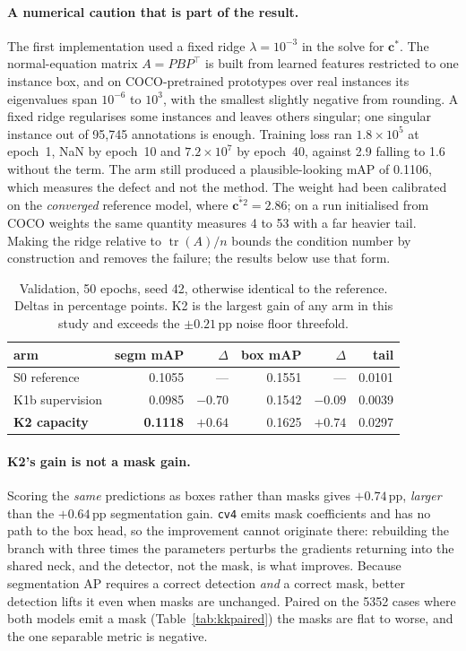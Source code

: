 \documentclass[11pt,letterpaper]{article}
\begin{document}
\paragraph{A numerical caution that is part of the result.} The first
implementation used a fixed ridge $\lambda=10^{-3}$ in the solve for
$\mathbf{c}^{*}$. The normal-equation matrix $A = PBP^{\top}$ is built from
learned features restricted to one instance box, and on COCO-pretrained
prototypes over real instances its eigenvalues span $10^{-6}$ to $10^{3}$, with
the smallest slightly negative from rounding. A fixed ridge regularises some
instances and leaves others singular; one singular instance out of 95{,}745
annotations is enough. Training loss ran $1.8\times10^{5}$ at epoch~1, NaN by
epoch~10 and $7.2\times10^{7}$ by epoch~40, against 2.9 falling to 1.6 without
the term. The arm still produced a plausible-looking mAP of 0.1106, which
measures the defect and not the method. The weight had been calibrated on the
\emph{converged} reference model, where $\overline{\mathbf{c}^{*2}}=2.86$; on a
run initialised from COCO weights the same quantity measures 4 to 53 with a far
heavier tail. Making the ridge relative to $\operatorname{tr}(A)/n$ bounds the
condition number by construction and removes the failure; the results below use
that form.

\begin{table}[h]
\centering\small
\begin{tabular}{lrrrrr}
\toprule
arm & segm mAP & $\Delta$ & box mAP & $\Delta$ & tail \\
\midrule
S0 reference & 0.1055 & --- & 0.1551 & --- & 0.0101 \\
K1b supervision & 0.0985 & $-0.70$ & 0.1542 & $-0.09$ & 0.0039 \\
\textbf{K2 capacity} & \textbf{0.1118} & $\mathbf{+0.64}$ & 0.1625 & $+0.74$ & 0.0297 \\
\bottomrule
\end{tabular}
\caption{Validation, 50 epochs, seed 42, otherwise identical to the reference.
Deltas in percentage points. K2 is the largest gain of any arm in this study and
exceeds the $\pm0.21$\,pp noise floor threefold.}
\label{tab:kk}
\end{table}

\paragraph{K2's gain is not a mask gain.} Scoring the \emph{same} predictions as
boxes rather than masks gives $+0.74$\,pp, \emph{larger} than the $+0.64$\,pp
segmentation gain. \texttt{cv4} emits mask coefficients and has no path to the
box head, so the improvement cannot originate there: rebuilding the branch with
three times the parameters perturbs the gradients returning into the shared
neck, and the detector, not the mask, is what improves. Because segmentation AP
requires a correct detection \emph{and} a correct mask, better detection lifts
it even when masks are unchanged. Paired on the 5352 cases where both models
emit a mask (Table~\ref{tab:kkpaired}) the masks are flat to worse, and the one
separable metric is negative.
\end{document}
